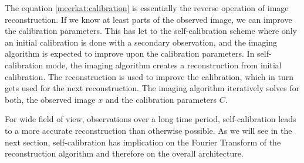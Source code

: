 The equation \eqref{meerkat:calibration} is essentially the reverse operation of image reconstruction. If we know at least parts of the observed image, we can improve the calibration parameters. This has let to the self-calibration scheme where only an initial calibration is done with a secondary observation, and the imaging algorithm is expected to improve upon the calibration parameters. In self-calibration mode, the imaging algorithm creates a reconstruction from initial calibration. The reconstruction is used to improve the calibration, which in turn gets used for the next reconstruction. The imaging algorithm iteratively solves for both, the observed image $x$ and the calibration parameters $C$.

For wide field of view, observations over a long time period, self-calibration leads to a more accurate reconstruction than otherwise possible. As we will see in the next section, self-calibration has implication on the Fourier Transform of the reconstruction algorithm and therefore on the overall architecture.






